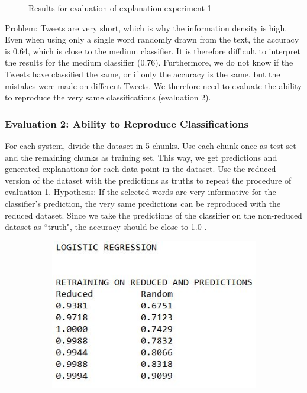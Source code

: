 {\begin{figure}[H]
\begin{subfigure}[b]{0.4\textwidth}
	\end{subfigure}
	\caption{Results for evaluation of explanation experiment 1}
	\label{fig:results_expleval1}
\end{figure}
Problem: Tweets are very short, which is why the information density is high. Even when using only a single word randomly drawn from the text, the accuracy is 0.64, which is close to the medium classifier. It is therefore difficult to interpret the results for the medium classifier (0.76). Furthermore, we do not know if the Tweets have classified the same, or if only the accuracy is the same, but the mistakes were made on different Tweets. We therefore need to evaluate the ability to reproduce the very same classifications (evaluation 2).


\subsubsection{Evaluation 2: Ability to Reproduce Classifications}
For each system, divide the dataset in 5 chunks. Use each chunk once as test set and the remaining chunks as training set. This way, we get predictions and generated explanations for each data point in the dataset. Use the reduced version of the dataset with the predictions as truths to repeat the procedure of evaluation 1. Hypothesis: If the selected words are very informative for the classifier's prediction, the very same predictions can be reproduced with the reduced dataset. Since we take the predictions of the classifier on the non-reduced dataset as ``truth", the accuracy should be close to 1.0 .
\begin{figure}[H]
	\centering
	\begin{subfigure}[b]{0.4\textwidth}
		\includegraphics[width=\textwidth]{img/expleval2_logreg.JPG}

\end{subfigure}
\end{figure}}
